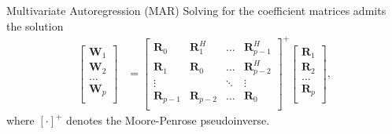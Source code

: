 \documentclass{beamer}
\begin{document}
  \begin{frame}{Multivariate Autoregression (MAR)}
    Solving for the coefficient matrices admits the solution
    \begin{align}
      \begin{bmatrix}
        \mathbf W_{1} \\ \mathbf W_{2} \\ \dots \\ \mathbf W_{p} \\
      \end{bmatrix}
      &= 
      \begin{bmatrix}
        \mathbf R_{0} & \mathbf R_1^H & \dots  & \mathbf R_{p-1}^H \\
        \mathbf R_{1} & \mathbf R_0   & \dots  & \mathbf R_{p-2}^H \\
        \vdots      &         & \ddots & \vdots \\
        \mathbf R_{p-1} & \mathbf R_{p-2}   & \dots  & \mathbf R_{0} \\
      \end{bmatrix}^{+}
      \begin{bmatrix}
        \mathbf R_{1} \\ \mathbf R_{2} \\ \dots \\ \mathbf R_{p} \\
      \end{bmatrix}, \label{eq:mar-solution}
    \end{align}
    where $[\cdot]^+$ denotes the Moore-Penrose pseudoinverse.
  \end{frame}

\end{document}
